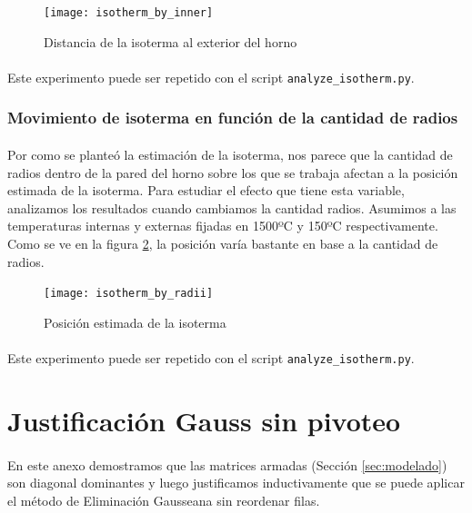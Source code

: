 \documentclass[12pt]{article}
\begin{document}
\begin{figure}[H]
\centering
\texttt{[image: isotherm\_by\_inner]}
\caption{Distancia de la isoterma al exterior del horno}
\label{fig:isotherm_by_inner}
\end{figure}

\paragraph{} Este experimento puede ser repetido con el script \texttt{analyze\_isotherm.py}.

\subsubsection{Movimiento de isoterma en función de la cantidad de radios}

\paragraph{} Por como se planteó la estimación de la isoterma, nos parece que la cantidad de radios dentro de la pared del horno sobre los que se trabaja afectan a la posición estimada de la isoterma. Para estudiar el efecto que tiene esta variable, analizamos los resultados cuando cambiamos la cantidad radios. Asumimos a las temperaturas internas y externas fijadas en 1500ºC y 150ºC respectivamente. \\
Como se ve en la figura \ref{fig:isotherm_by_radii}, la posición varía bastante en base a la cantidad de radios.

\begin{figure}[H]
\centering
\texttt{[image: isotherm\_by\_radii]}
\caption{Posición estimada de la isoterma}
\label{fig:isotherm_by_radii}
\end{figure}

\paragraph{} Este experimento puede ser repetido con el script \texttt{analyze\_isotherm.py}.

\pagebreak
\appendix 
\renewcommand{\thesection}{\Roman{section}}

\section{Justificación Gauss sin pivoteo} 
\label{appendix:justificacion}

\paragraph{} En este anexo demostramos que las matrices armadas (Sección \ref{sec:modelado}) son diagonal dominantes y luego justificamos inductivamente que se puede aplicar el método de Eliminación Gausseana sin reordenar filas.
\end{document}
